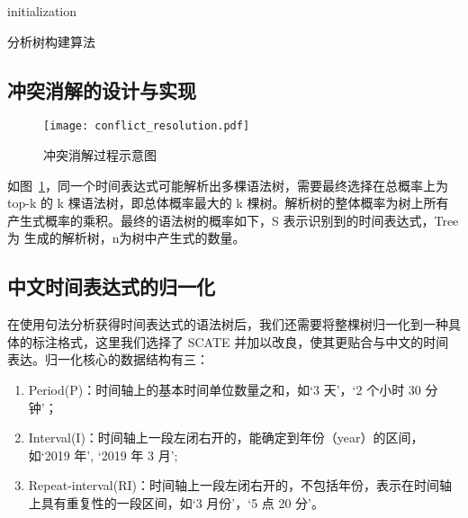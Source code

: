 \begin{algorithm}[h]
    \SetAlgoLined
    initialization\;
     {
    }
    \caption{分析树构建算法}
    \label{algo:tree_construction}
\end{algorithm}

\subsection{冲突消解的设计与实现}

\begin{figure}[h]
    \centering
    \texttt{[image: conflict\_resolution.pdf]}
    \caption{冲突消解过程示意图}
    \label{fig:conflict_resolution}
\end{figure}

如图~\ref{fig:conflict_resolution}，同一个时间表达式可能解析出多棵语法树，需要最终选择在总概率上为 top-k 的
k 棵语法树，即总体概率最大的 k 棵树。解析树的整体概率为树上所有产生式概率的乘积。最终的语法树的概率如下，S 表示识别到的时间表达式，Tree 为
生成的解析树，n为树中产生式的数量。

\subsection{中文时间表达式的归一化}

在使用句法分析获得时间表达式的语法树后，我们还需要将整棵树归一化到一种具体的标注格式，这里我们选择了 SCATE 并加以改良，使其更贴合与中文的时间表达。归一化核心的数据结构有三：
\begin{enumerate}
    \item Period(P)：时间轴上的基本时间单位数量之和，如‘3 天’，‘2 个小时 30 分钟’；
    \item Interval(I)：时间轴上一段左闭右开的，能确定到年份（year）的区间，如‘2019 年’, ‘2019 年 3 月’;
    \item Repeat-interval(RI)：时间轴上一段左闭右开的，不包括年份，表示在时间轴上具有重复性的一段区间，如‘3 月份’，‘5 点 20 分’。
\end{enumerate}

